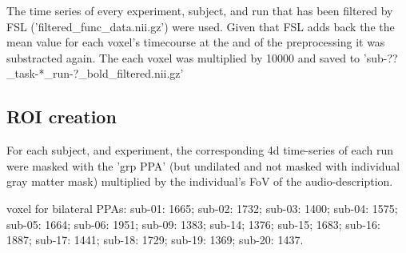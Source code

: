 
%
The time series of every experiment, subject, and run that has been filtered
by FSL ('filtered\_func\_data.nii.gz') were used.
%
Given that FSL adds back the the mean value for each voxel's timecourse at the
and of the preprocessing it was substracted again.
%
The each voxel was multiplied by 10000%
and saved to 'sub-??\_task-*\_run-?\_bold\_filtered.nii.gz'

\subsection{ROI creation}







For each subject, and experiment, the corresponding 4d time-series of each run
were masked with the 'grp PPA' (but undilated and not masked with individual
gray matter mask) multiplied by the individual's FoV of the audio-description.

%
voxel for bilateral PPAs:
sub-01: 1665;
sub-02: 1732;
sub-03: 1400;
sub-04: 1575;
sub-05: 1664;
sub-06: 1951;
sub-09: 1383;
sub-14; 1376;
sub-15; 1683;
sub-16: 1887;
sub-17: 1441;
sub-18: 1729;
sub-19: 1369;
sub-20: 1437.

